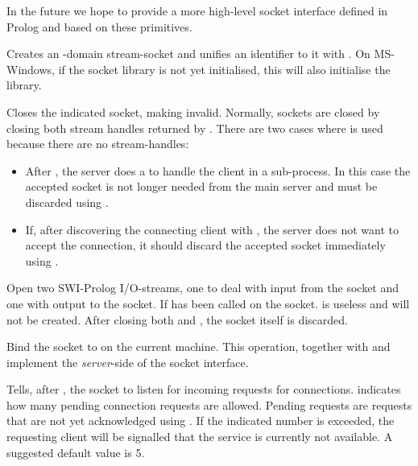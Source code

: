 \documentclass[11pt]{article}
\begin{document}
In the future we hope to provide a more high-level socket interface
defined in Prolog and based on these primitives.

\begin{description}
Creates an -domain stream-socket and unifies an identifier
to it with . On MS-Windows, if the socket library is not
yet initialised, this will also initialise the library.

Closes the indicated socket, making  invalid.  Normally,
sockets are closed by closing both stream handles returned by
.  There are two cases where  is used
because there are no stream-handles:

\begin{itemize}
    \item After , the server does a  to handle the client
	  in a sub-process. In this case the accepted socket is not
	  longer needed from the main server and must be discarded
	  using .
    \item If, after discovering the connecting client with ,
          the server does not want to accept the connection, it should
	  discard the accepted socket immediately using .
\end{itemize}

Open two SWI-Prolog I/O-streams, one to deal with input from the socket
and one with output to the socket.  If  has been called on the
socket.  is useless and will not be created. After closing
both  and , the socket itself is discarded.

Bind the socket to  on the current machine.  This operation,
together with  and  implement the {\em server}-side of
the socket interface.

Tells, after , the socket to listen for incoming requests for
connections.   indicates how many pending connection
requests are allowed.  Pending requests are requests that are not yet
acknowledged using .  If the indicated number is exceeded, the
requesting client will be signalled that the service is currently not
available.  A suggested default value is 5.


\end{description}
\end{document}
